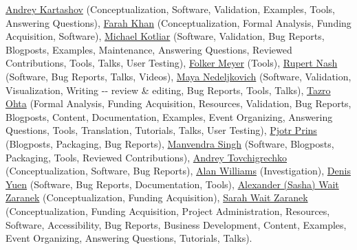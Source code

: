 \documentclass[sigconf,authordraft]{acmart}
\begin{document}
\begin{acks}
\href{https://orcid.org/0000-0001-9102-5681}{Andrey Kartashov} (Conceptualization, Software, Validation, Examples, Tools, Answering Questions),
\href{https://orcid.org/0000-0002-6337-3037}{Farah Khan} (Conceptualization, Formal Analysis, Funding Acquisition, Software),
\href{https://orcid.org/0000-0002-6486-3898}{Michael Kotliar} (Software, Validation, Bug Reports, Blogposts, Examples, Maintenance, Answering Questions, Reviewed Contributions, Tools, Talks, User Testing),
\href{https://orcid.org/0000-0003-1112-2284}{Folker Meyer} (Tools),
\href{https://orcid.org/0000-0002-6388-7353}{Rupert Nash} (Software, Bug Reports, Talks, Videos),
\href{https://orcid.org/0000-0003-3705-948X}{Maya Nedeljkovich} (Software, Validation, Visualization, Writing -\/- review \& editing, Bug Reports, Tools, Talks),
\href{https://orcid.org/0000-0003-3777-5945}{Tazro Ohta} (Formal Analysis, Funding Acquisition, Resources, Validation, Bug Reports, Blogposts, Content, Documentation, Examples, Event Organizing, Answering Questions, Tools, Translation, Tutorials, Talks, User Testing),
\href{https://orcid.org/0000-0002-8021-9162}{Pjotr Prins} (Blogposts, Packaging, Bug Reports),
\href{https://orcid.org/0000-0001-9279-9910}{Manvendra Singh} (Software, Blogposts, Packaging, Tools, Reviewed Contributions),
\href{https://orcid.org/0000-0002-0959-4429}{Andrey Tovchigrechko} (Conceptualization, Software, Bug Reports),
\href{https://orcid.org/0000-0003-3156-2105}{Alan Williams} (Investigation),
\href{https://orcid.org/0000-0002-6130-1021}{Denis Yuen} (Software, Bug Reports, Documentation, Tools),
\href{https://orcid.org/0000-0002-0415-9655}{Alexander (Sasha) Wait Zaranek} (Conceptualization, Funding Acquisition),
\href{https://orcid.org/0000-0003-4716-9121}{Sarah Wait Zaranek} (Conceptualization, Funding Acquisition, Project Administration, Resources, Software, Accessibility, Bug Reports, Business Development, Content, Examples, Event Organizing, Answering Questions, Tutorials, Talks).


\end{acks}
\end{document}
